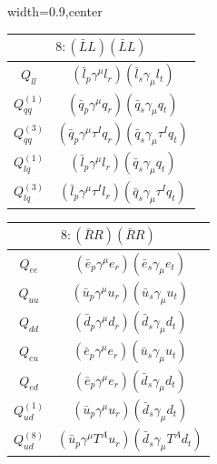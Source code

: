 \begin{table}[H]
\begin{center}
\begin{adjustbox}{width=0.9\textwidth,center}
%
\begin{minipage}[t]{4.75cm}
\renewcommand{\arraystretch}{1.5}
\begin{tabular}[t]{c|c}
\multicolumn{2}{c}{\boldmath$8:(\bar L L)(\bar L L)$} \\
\hline
$Q_{ll}$        & $(\bar l_p \gamma^\mu l_r)(\bar l_s \gamma_\mu l_t)$ \\
%
$Q_{qq}^{(1)}$  & $(\bar q_p \gamma^\mu q_r)(\bar q_s \gamma_\mu q_t)$ \\
%
$Q_{qq}^{(3)}$  & $(\bar q_p \gamma^\mu \tau^I q_r)(\bar q_s \gamma_\mu \tau^I q_t)$ \\
%
$Q_{lq}^{(1)}$                & $(\bar l_p \gamma^\mu l_r)(\bar q_s \gamma_\mu q_t)$ \\
%
$Q_{lq}^{(3)}$                & $(\bar l_p \gamma^\mu \tau^I l_r)(\bar q_s \gamma_\mu \tau^I q_t)$ 
\end{tabular}
\end{minipage}
\hspace{0.2cm}
%
%
%
\begin{minipage}[t]{5.25cm}
\renewcommand{\arraystretch}{1.5}
\begin{tabular}[t]{c|c}
\multicolumn{2}{c}{\boldmath$8:(\bar R R)(\bar R R)$} \\
\hline
$Q_{ee}$               & $(\bar e_p \gamma^\mu e_r)(\bar e_s \gamma_\mu e_t)$ \\
%
$Q_{uu}$        & $(\bar u_p \gamma^\mu u_r)(\bar u_s \gamma_\mu u_t)$ \\
%
$Q_{dd}$        & $(\bar d_p \gamma^\mu d_r)(\bar d_s \gamma_\mu d_t)$ \\
%
$Q_{eu}$                      & $(\bar e_p \gamma^\mu e_r)(\bar u_s \gamma_\mu u_t)$ \\
%
$Q_{ed}$                      & $(\bar e_p \gamma^\mu e_r)(\bar d_s\gamma_\mu d_t)$ \\
%
$Q_{ud}^{(1)}$                & $(\bar u_p \gamma^\mu u_r)(\bar d_s \gamma_\mu d_t)$ \\
%
$Q_{ud}^{(8)}$                & $(\bar u_p \gamma^\mu T^A u_r)(\bar d_s \gamma_\mu T^A d_t)$ \\
%
\end{tabular}
\end{minipage}
\hspace{0.2cm}
%
%
\begin{minipage}[t]{4.75cm}
\renewcommand{\arraystretch}{1.5}
\begin{tabular}[t]{c|c}

\end{tabular}
\end{minipage}
\end{adjustbox}
\end{center}
\end{table}
